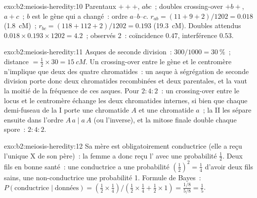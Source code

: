 \begin{solution}{exo:b2:meiosis-heredity:10}
Parentaux $+++$, $abc$~; doubles crossing-over $+b+$, $a+c$~; $b$ est le
gène qui a changé~: ordre $a$--$b$--$c$. $r_{ab} = (11 + 9 + 2)/1202
= 0.018$ (\qty{1.8}{cM})~; $r_{bc} = (118 + 112 + 2)/1202 = 0.193$
(\qty{19.3}{cM}). Doubles attendus $0.018\times 0.193\times 1202 =
4.2$~; observés 2~: coïncidence $0.47$, interférence $0.53$.
\end{solution}

\begin{solution}{exo:b2:meiosis-heredity:11}
Asques de seconde division~: $300/1000 = \qty{30}{\%}$~; distance $=
\tfrac12\times 30 = \qty{15}{cM}$. Un crossing-over entre le gène et le
centromère n'implique que deux des quatre chromatides~: un asque à
ségrégation de seconde division porte donc deux chromatides
recombinées et deux parentales, et la  vaut
la moitié de la fréquence de ces asques. Pour $2 : 4 : 2$~: un
crossing-over entre le locus et le centromère échange les deux
chromatides internes, si bien que chaque demi-fuseau de la  I
porte une chromatide $A$ et une chromatide $a$~; la  II les
sépare ensuite dans l'ordre $A\,a \mid
a\,A$ (ou l'inverse), et la mitose finale double chaque spore~:
$2 : 4 : 2$.
\end{solution}

\begin{solution}{exo:b2:meiosis-heredity:12}
Sa mère est obligatoirement conductrice (elle a reçu l'unique X de son
père)~: la femme a donc reçu l' avec une probabilité $\tfrac12$.
Deux fils en bonne santé~: une conductrice a une probabilité
$(\tfrac12)^2 = \tfrac14$ d'avoir deux fils sains, une non-conductrice
une probabilité 1. Formule de Bayes~:
$P(\text{conductrice}\mid\text{données}) = (\tfrac12\times\tfrac14)/(\tfrac12
\times\tfrac14 + \tfrac12\times 1) = \tfrac{1/8}{5/8} = \tfrac15$.
\end{solution}

